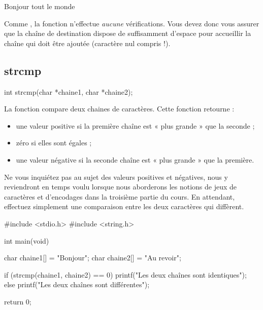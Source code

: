 \begin{C}
Bonjour tout le monde
\end{C}

\begin{erreurbox}
  Comme , la fonction
 n'effectue \emph{aucune} vérifications. Vous devez
donc vous assurer que la chaîne de destination dispose de suffisamment
d'espace pour accueillir la chaîne qui doit être ajoutée (caractère nul
compris !).
\end{erreurbox}


\subsection{strcmp}
\label{strcmp-1}

\begin{C}
int strcmp(char *chaine1, char *chaine2);
\end{C}

La fonction  compare deux chaines de caractères. Cette
fonction retourne :

\begin{itemize}
\item
  une valeur positive si la première chaîne est « plus grande » que la
  seconde ;
\item
  zéro si elles sont égales ;
\item
  une valeur négative si la seconde chaîne est « plus grande » que la
  première.
\end{itemize}

\begin{infobox}
  Ne vous inquiétez pas au sujet des
valeurs positives et négatives, nous y reviendront en temps voulu
lorsque nous aborderons les notions de jeux de caractères et d'encodages
dans la troisième partie du cours. En attendant, effectuez simplement
une comparaison entre les deux caractères qui diffèrent.
\end{infobox}


\begin{C}
#include <stdio.h>
#include <string.h>


int main(void)
{
    char chaine1[] = "Bonjour";
    char chaine2[] = "Au revoir";

    if (strcmp(chaine1, chaine2) == 0)
        printf("Les deux chaînes sont identiques\n");
    else
        printf("Les deux chaînes sont différentes\n");

    return 0;
}
\end{C}

